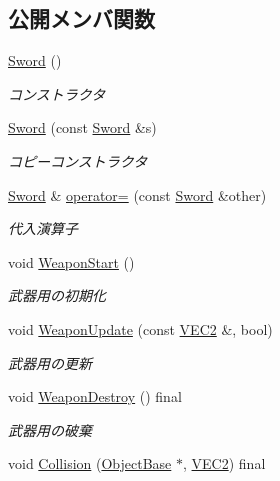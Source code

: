 \subsection*{公開メンバ関数}
\begin{DoxyCompactItemize}
\item 
\mbox{\hyperlink{class_sword_af33284e40825ec8ddccd01fa5833be36}{Sword}} ()
\begin{DoxyCompactList}\small\item\em コンストラクタ \end{DoxyCompactList}\item 
\mbox{\hyperlink{class_sword_a6a55d930547584000fcc7c63d47ffabf}{Sword}} (const \mbox{\hyperlink{class_sword}{Sword}} \&s)
\begin{DoxyCompactList}\small\item\em コピーコンストラクタ \end{DoxyCompactList}\item 
\mbox{\hyperlink{class_sword}{Sword}} \& \mbox{\hyperlink{class_sword_a47720cf8f0a44a9a30cf586a188a4730}{operator=}} (const \mbox{\hyperlink{class_sword}{Sword}} \&other)
\begin{DoxyCompactList}\small\item\em 代入演算子 \end{DoxyCompactList}\item 
void \mbox{\hyperlink{class_sword_aa145196b7a7f01fd6fb6d4e323451b06}{Weapon\+Start}} ()
\begin{DoxyCompactList}\small\item\em 武器用の初期化 \end{DoxyCompactList}\item 
void \mbox{\hyperlink{class_sword_a11b6e50545688b52175a7089c61ac168}{Weapon\+Update}} (const \mbox{\hyperlink{common_8h_afb0c5e21d4133ff4f200992c0b534e1b}{V\+E\+C2}} \&, bool)
\begin{DoxyCompactList}\small\item\em 武器用の更新 \end{DoxyCompactList}\item 
void \mbox{\hyperlink{class_sword_a3f60d8b24b7847d6a84f0941820b711d}{Weapon\+Destroy}} () final
\begin{DoxyCompactList}\small\item\em 武器用の破棄 \end{DoxyCompactList}\item 
void \mbox{\hyperlink{class_sword_acb6e5846afb674bc1ec47dcfee0a6bd3}{Collision}} (\mbox{\hyperlink{class_object_base}{Object\+Base}} $\ast$, \mbox{\hyperlink{common_8h_afb0c5e21d4133ff4f200992c0b534e1b}{V\+E\+C2}}) final

\end{DoxyCompactItemize}
